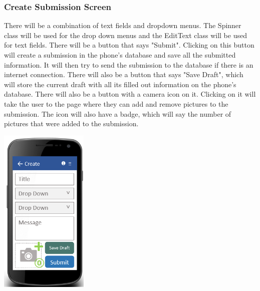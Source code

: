 \documentclass[onecolumn, draftclsnofoot,10pt, compsoc]{IEEEtran}
\begin{document}
\subsubsection{Create Submission Screen}
There will be a combination of text fields and dropdown menus. The Spinner class will be used for the drop down menus and the EditText class will be used for text fields. There will be a button that says "Submit". Clicking on this button will create a submission in the phone's database and save all the submitted information. It will then try to send the submission to the database if there is an internet connection. There will also be a button that says "Save Draft", which will store the current draft with all its filled out information on the phone's database. There will also be a button with a camera icon on it. Clicking on it will take the user to the page where they can add and remove pictures to the submission. The icon will also have a badge, which will say the number of pictures that were added to the submission.
\newline
\begin{center}
\includegraphics[height=8cm]{createscreen.png}
\end{center}
\end{document}
